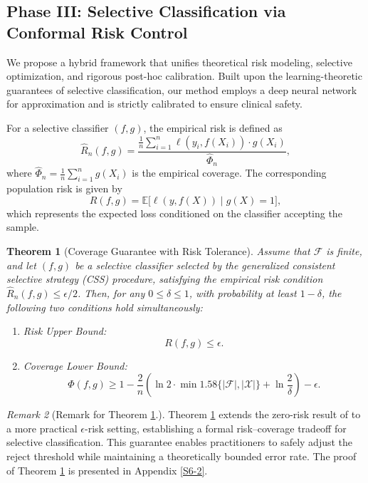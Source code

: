 \documentclass[journal]{IEEEtran}
\newtheorem{theorem}{Theorem}[section]
\theoremstyle{remark}
\newtheorem{remark}[theorem]{Remark}
\providecommand{\citep}[1]{\cite{#1}}
\begin{document}
\subsection{Phase III: Selective Classification via Conformal Risk Control}\label{sec:phase3_method}

We propose a hybrid framework that unifies theoretical risk modeling, selective optimization, and rigorous post-hoc calibration. Built upon the learning-theoretic guarantees of selective classification, our method employs a deep neural network for approximation and is strictly calibrated to ensure clinical safety.

For a selective classifier $(f,g)$, the empirical risk is defined as
\[
\hat{R}_n(f,g) = \frac{\frac{1}{n} \sum_{i=1}^n \ell(y_i, f(X_i)) \cdot g(X_i)}
{\hat{\Phi}_n},
\]
where $\hat{\Phi}_n = \frac{1}{n} \sum_{i=1}^n g(X_i)$ is the empirical coverage.
The corresponding population risk is given by
\[
R(f,g) = \mathbb{E}\bigl[\ell(y, f(X)) \mid g(X) = 1\bigr],
\]
which represents the expected loss conditioned on the classifier accepting the sample.
\begin{theorem}[Coverage Guarantee with Risk Tolerance]\label{Th2}
Assume that $\mathcal{F}$ is finite, and let $(f,g)$ be a selective classifier selected by the generalized consistent selective strategy (CSS) procedure, satisfying the empirical risk condition $\hat{R}_n(f,g) \leq \epsilon/2$. Then, for any $0 \leq \delta \leq 1$, with probability at least $1-\delta$, the following two conditions hold simultaneously:
\begin{enumerate}
    \item Risk Upper Bound: 
    \[R(f,g) \leq \epsilon.
    \]
    \item Coverage Lower Bound:
    \[
    \Phi(f,g) \geq 1 - \frac{2}{n} \left( \ln 2 \cdot \min1.58\{|\mathcal{F}|, |\mathcal{X}|\} + \ln \frac{2}{\delta} \right) - \epsilon.
    \]
\end{enumerate}
\end{theorem}
\begin{remark}[Remark for Theorem \ref{Th2}.]
Theorem \ref{Th2} extends the zero-risk result of \citep{el2010foundations} to a more practical $\epsilon$-risk setting, establishing a formal risk–coverage tradeoff for selective classification. This guarantee enables practitioners to safely adjust the reject threshold while maintaining a theoretically bounded error rate. The proof of Theorem \ref{Th2} is presented in Appendix \ref{S6-2}.
\end{remark}
\end{document}
